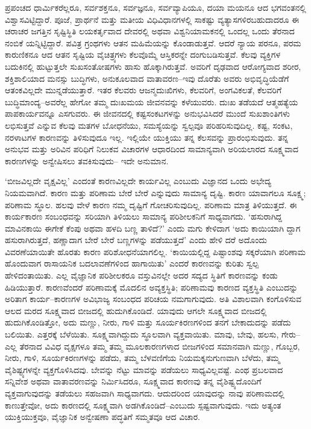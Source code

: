 ಪ್ರಪಂಚದ ಧಾರ್ಮಿಕರೆಲ್ಲರೂ, ಸರ್ವಶಕ್ತನೂ, ಸರ್ವಜ್ಞನೂ, ಸರ್ವವ್ಯಾಪಿಯೂ, ದಯಾ ಮಯನೂ ಆದ ಭಗವಂತನಲ್ಲಿ ವಿಶ್ವಾಸವಿಟ್ಟಿದ್ದಾರೆ. ಪೂಜೆ, ಪ್ರಾರ್ಥನೆ ಮತ್ತು ಮತೀಯ ವಿಧಿವಿಧಾನಗಳಲ್ಲಿ ಸಾಕಷ್ಟು ವ್ಯತ್ಯಾಸಗಳಿರಬಹುದಾದರೂ ಈ ಚರಾಚರ ಜಗತ್ತಿನ ಸೃಷ್ಟಿಸ್ಥಿತಿ ಲಯಕರ್ತೃವಾದ ದೇವರಲ್ಲಿ ಅಥವಾ ವಿಶ್ವನಿಯಾಮಕನಲ್ಲಿ ಒಂದಲ್ಲ ಒಂದು ತೆರನಾದ ನಂಬಿಕೆ ಯನ್ನಿಟ್ಟಿದ್ದಾರೆ. ಪವಿತ್ರ ಗ್ರಂಥಗಳು ಆತನ ಮಹಿಮೆಯನ್ನು ಕೊಂಡಾಡುತ್ತವೆ. ಆದರೆ ನ್ಯಾಯ ಪರನೂ, ಪರಮ ಕಾರುಣಿಕನೂ ಆದ ಆತನ ಸೃಷ್ಟಿಯ ವೈಚಿತ್ರ್ಯಗಳು ಕೆಲವೊಮ್ಮೆ ಆಸ್ತಿಕರನ್ನೇ ದಂಗುಬಡಿಸುತ್ತವೆ. ಕೆಲವು ವ್ಯಕ್ತಿಗಳ ಬದುಕಿನಲ್ಲಿ ಹುಟ್ಟುತ್ತಲೇ ಸುಖಸಂತೋಷಗಳು ಹಾಸು ಹೊಕ್ಕಾಗಿರುತ್ತವೆ. ಅವರಿಗೆ ದೃಢವಾದ ಆರೋಗ್ಯವಾದ ಶರೀರ, ಶಕ್ತಿಶಾಲಿಯಾದ ಮನಸ್ಸು ಬುದ್ಧಿಗಳು, ಅನುಕೂಲವಾದ ವಾತಾವರಣ–ಇವು ದೊರೆತು ಅವರು ಅಭಿವೃದ್ಧಿಯೆಡೆಗೆ ಆತಂಕವಿಲ್ಲದೇ ಮುನ್ನಡೆಯುತ್ತಾರೆ. ಇತರ ಕೆಲವರು ಆಜನ್ಮದುಃಖಿಗಳು, ಕೆಲವರಿಗೆ, ಅಂಗವಿಕಲತೆ, ಕೆಲವರಿಗೆ ಬುದ್ಧಿಮಾಂದ್ಯ–ಅವರೆಲ್ಲ ಹೇಗೋ ತಮ್ಮ ದುಃಖಮಯ ಜೀವನವನ್ನು ಕಳೆಯುವರು. ದುಃಖ ತಡೆಯದೆ ಆತ್ಮಹತ್ಯೆಯ ಪಾಪಕಾರ್ಯವನ್ನೂ ಎಸಗುವರು. ಈ ಜೀವನದಲ್ಲಿ ಕಷ್ಟಸಂಕಟಗಳನ್ನು ಅನುಭವಿಸಿದರೆ ಮುಂದೆ ಸುಖಶಾಂತಿಗಳು ಲಭಿಸುತ್ತವೆ ಎನ್ನುವ ಕೆಲವು ಮತಗಳ ಬೋಧನೆಯು, ಸಮಸ್ಯೆಯನ್ನು ಸ್ವಲ್ಪವೂ ಪರಿಹರಿಸುವುದಿಲ್ಲ. ಕಷ್ಟ, ಸಂಕಟ, ನರಳಾಟಗಳ ಕಾರಣವನ್ನು ತಿಳಿಸುವುದೂ ಇಲ್ಲ. ಇಲ್ಲಿಯೇ ಯುಕ್ತಿಯು ತನ್ನ ಕೆಲಸವನ್ನು ಪ್ರಾರಂಭಿಸುವುದು. ತನ್ನ ಅನುಭವ ಮತ್ತು ಅರಿವಿನ ಪರಿಧಿಗೆ ನಿಲುಕವ ವಿಚಾರಗಳ ಆಧಾರದಿಂದ ಸಾಮಾನ್ಯವಾಗಿ ಅರಿಯಲಾರದ ಸೂಕ್ಷ್ಮವಾದ ಕಾರಣಗಳನ್ನು ಅನ್ವೇಷಿಸಲು ತವಕಿಸುವುದು– ಇದೇ ಅನುಮಾನ.

‘ಬೀಜವಿಲ್ಲದೇ ವೃಕ್ಷವಿಲ್ಲ’ ಎಂದಂತೆ ಕಾರಣವಿಲ್ಲದೇ ಕಾರ್ಯವಿಲ್ಲ ಎಂಬುದು ವಿಜ್ಞಾನದ ಒಂದು ಅಭೇದ್ಯ ನಿಯಮವಾಗಿದೆ. ಕಾರಣ ಮತ್ತು ಪರಿಣಾಮ ಬೇರೆ ಬೇರೆ ಎನ್ನುವುದು ಸಾಮಾನ್ಯ ದೃಷ್ಟಿ. ಕಾರಣ ಯಾವಾಗಲೂ ಸೂಕ್ಷ್ಮ; ಪರಿಣಾಮ ಸ್ಥೂಲ. ಹಲವು ವೇಳೆ ಕಾರಣ ನಮ್ಮ ದೃಷ್ಟಿಗೆ ಗೋಚರಿಸುವುದಿಲ್ಲ. ಪರಿಣಾಮ ಮಾತ್ರ ತಿಳಿಯುತ್ತದೆ. ಈ ಕಾರ್ಯಕಾರಣ ಸಂಬಂಧವನ್ನು ಸರಿಯಾಗಿ ತಿಳಿಯಲು ಸಾಮಾನ್ಯ ಪರಿಶೀಲಕನಿಗೆ ಸಾಧ್ಯವಾಗದು. ‘ಹಸುರಾಗಿದ್ದ ಮಾವಿನಕಾಯಿ ಈಗೇಕೆ ಕೆಂಪು ಅಥವಾ ಹಳದಿ ಬಣ್ಣ ತಾಳಿದೆ?’ ಎಂದು ಮಗು ಕೇಳಿದಾಗ ‘ಅದು ಕಾಯಿಯಾಗಿ ದ್ದಾಗ ಹಸುರಾಗಿರುತ್ತದೆ, ಹಣ್ಣಾದಾಗ ಬೇರೆ ಬೇರೆ ಬಣ್ಣಗಳನ್ನು ಪಡೆಯುತ್ತದೆ’ ಎಂದು ಹೇಳಿ ದರೆ ಅದೊಂದು ವಿವರಣೆಯಾಯಿತೇ ಹೊರತು ಕಾರಣ ಪರಿಶೋಧನೆಯಾಗಲಿಲ್ಲ. ‘ಕಾಯಿಯಲ್ಲಿದ್ದ ಪಿಷ್ಟಾಂಶವು ಸಕ್ಕರೆಯಾಗಿ ಪರಿಣಾಮ ಹೊಂದುವಾಗ ರಾಸಾಯನಿಕ ಬದಲಾವಣೆಗಳಿಂದ ಹಾಗಾಯಿತು’ ಎಂದರೆ ಕಾರಣವನ್ನು ಕುರಿತು ಸ್ವಲ್ಪ ಹೇಳಿದಂತಾಯಿತು. ಎಲ್ಲ ವೈಜ್ಞಾನಿಕ ಪರಿಶೀಲಕರೂ ವಸ್ತುವಿನಲ್ಲೇ ಅದರ ಸದ್ಯದ ಸ್ಥಿತಿಗೆ ಕಾರಣವನ್ನು ಕಂಡು ಹಿಡಿಯುತ್ತಾರೆ. ಕಾರಣವೆಂದರೆ ಪರಿಣಾಮಕ್ಕೆ ಮೊದಲಿನ ಅವ್ಯಕ್ತಸ್ಥಿತಿ; ಪರಿಣಾಮವು ಕಾರಣದ ವ್ಯಕ್ತಸ್ಥಿತಿ ಎಂಬುದನ್ನು ಅರಿತಾಗ ಕಾರ್ಯ–ಕಾರಣಗಳ ಅವಿಭಾಜ್ಯ ಸಂಬಂಧದ ಪರಿಚಯ ನಮಗಾಗುವುದು. ಅತಿ ವಿಶಾಲವಾಗಿ ಕಂಗೊಳಿಸುವ ಆಲದ ಮರದ ಸೂಕ್ಷ್ಮವಾದ ಬೀಜದಲ್ಲಿ ಹುದುಗಿಕೊಂಡಿದೆ. ಯಾವುದು ಆಗಲೇ ಸೂಕ್ಷ್ಮವಾದ ಬೀಜದಲ್ಲಿ ಹುದುಗಿಕೊಂಡಿತ್ತೋ, ಅದು ಮಣ್ಣು, ನೀರು, ಗಾಳಿ ಮತ್ತು ಸೂರ್ಯಕಿರಣಗಳಿಂದ ತನಗೆ ಬೇಕಾದುದನ್ನು ಪಡೆದು ಬಲಿಯಿತು. ಎತ್ತರಕ್ಕೆ ಬೆಳೆಯಿತು. ಸೂಕ್ಷ್ಮವಾಗಿದ್ದುದು ಸ್ಥೂಲವಾಗಿ ವ್ಯಕ್ತವಾಯಿತು. ಮಾವು, ಬೇವು, ಹಲಸು, ಗೇರು–ಎಲ್ಲ ತೆರನಾದ ವಿವಿಧ ವೃಕ್ಷಗಳೂ ತಮ್ಮ ತಮ್ಮ ಮೂಲಕಾರಣಗಳಾದ ಬೀಜಗಳಿಂದ ಸಮಾನವಾಗಿ ಮಣ್ಣು, ಗೊಬ್ಬರ, ನೀರು, ಗಾಳಿ, ಸೂರ್ಯಕಿರಣಗಳನ್ನು ಪಡೆದು, ತಮ್ಮ ಬೆಳವಣಿಗೆಯ ನಿಯಮಕ್ಕನುಗುಣವಾಗಿ ಬೆಳೆದು, ತಮ್ಮ ವೈಶಿಷ್ಟ್ಯಗಳನ್ನೇ ವ್ಯಕ್ತಗೊಳಿಸಿದವು. ಬೇವನ್ನು ನೆಟ್ಟು ಮಾವನ್ನು ಪಡೆಯಲು ಸಾಧ್ಯವಿಲ್ಲವಷ್ಟೆ. ಎಂಥ ಪ್ರಬಲವಾದ ಸನ್ನಿವೇಶ ಅಥವಾ ವಾತಾವರಣವನ್ನು ನಿರ್ಮಿಸಿದರೂ, ಸೂಕ್ಷ್ಮವಾದ ಕಾರಣವು ತನ್ನ ವೈಶಿಷ್ಟ್ಯದೊಂದಿಗೆ ವ್ಯಕ್ತವಾಗುವುದನ್ನು ತಡೆಯಲು ಸಹಜವಾಗಿ ಸಾಧ್ಯವಾಗದು. ಆದುದರಿಂದ ಯಾವುದನ್ನು ನಾವು ಪರಿಣಾಮದಲ್ಲಿ ಕಾಣುತ್ತೇವೋ, ಅದು ಕಾರಣದಲ್ಲಿ ಸೂಕ್ಷ್ಮವಾಗಿ ಅಡಗಿಕೊಂಡಿದೆ–ಎಂಬುದು ಸ್ಪಷ್ಟವಾಗುವುದು. ಇದು ಅತ್ಯಂತ ಯುಕ್ತಿಯುಕ್ತವೂ, ವೈಜ್ಞಾನಿಕ ಅನ್ವೇಷಣಾ ಪದ್ಧತಿಗೆ ಸಮ್ಮತವೂ ಆದ ವಿಚಾರ.

